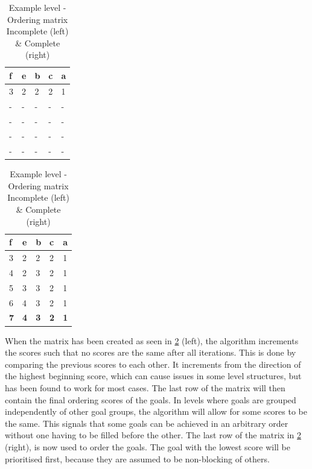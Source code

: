 \begin{table}[h!]
  \caption{\label{tab:example_matrix}\centering Example level - Ordering matrix \break Incomplete (left) \& Complete (right)}
	\begin{minipage}{.5\linewidth}
    \centering
    \begin{tabular}{@{}lllll@{}}
		\toprule
		\textbf{f} & \textbf{e} & \textbf{b} & \textbf{c} & \textbf{a} \\ \midrule
		3          & 2          & 2          & 2          & 1          \\ 
		-          & -          & -          & -          & -          \\ 
		-          & -          & -          & -          & -          \\ 
		-          & -          & -          & -          & -          \\ 
		-          & -          & -          & -          & -          \\ \bottomrule
		\end{tabular}
  \end{minipage}%
  \begin{minipage}{.5\linewidth}
    \centering
    \begin{tabular}{@{}lllll@{}}
		\toprule
		\textbf{f} & \textbf{e} & \textbf{b} & \textbf{c} & \textbf{a} \\ \midrule
		3          & 2          & 2          & 2          & 1          \\ 
		4          & 2          & 3          & 2          & 1          \\ 
		5          & 3          & 3          & 2          & 1          \\ 
		6          & 4          & 3          & 2          & 1          \\ \midrule
		\textbf{7} & \textbf{4} & \textbf{3} & \textbf{2} & \textbf{1} \\ \bottomrule
		\end{tabular}
  \end{minipage} 
\end{table}


When the matrix has been created as seen in \cref{tab:example_matrix} (left), the algorithm increments the scores such that no scores are the same after all iterations. 
This is done by comparing the previous scores to each other. 
It increments from the direction of the highest beginning score, which can cause issues in some level structures, but has been found to work for most cases.
The last row of the matrix will then contain the final ordering scores of the goals. 
In levels where goals are grouped independently of other goal groups, the algorithm will allow for some scores to be the same.
This signals that some goals can be achieved in an arbitrary order without one having to be filled before the other. 
The last row of the matrix in \cref{tab:example_matrix} (right), is now used to order the goals. 
The goal with the lowest score will be prioritised first, because they are assumed to be non-blocking of others. 


